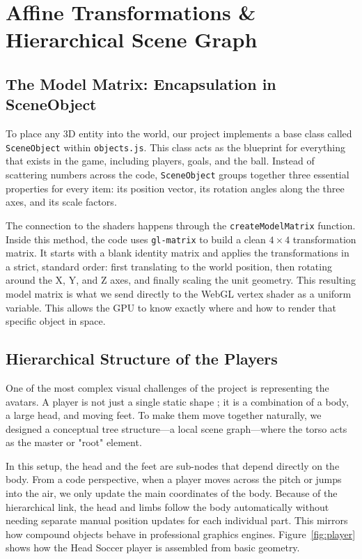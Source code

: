 \chapter{Affine Transformations \& Hierarchical Scene Graph}

\section{The Model Matrix: Encapsulation in SceneObject}
To place any 3D entity into the world, our project implements a base class called \texttt{SceneObject} within \texttt{objects.js}. This class acts as the blueprint for everything that exists in the game, including players, goals, and the ball. Instead of scattering numbers across the code, \texttt{SceneObject} groups together three essential properties for every item: its position vector, its rotation angles along the three axes, and its scale factors.

The connection to the shaders happens through the \texttt{createModelMatrix} function. Inside this method, the code uses \texttt{gl-matrix} to build a clean $4\times4$ transformation matrix. It starts with a blank identity matrix and applies the transformations in a strict, standard order: first translating to the world position, then rotating around the X, Y, and Z axes, and finally scaling the unit geometry. This resulting model matrix is what we send directly to the WebGL vertex shader as a uniform variable. This allows the GPU to know exactly where and how to render that specific object in space.

\section{Hierarchical Structure of the Players}
One of the most complex visual challenges of the project is representing the avatars. A player is not just a single static shape ; it is a combination of a body, a large head, and moving feet. To make them move together naturally, we designed a conceptual tree structure—a local scene graph—where the torso acts as the master or "root" element.

In this setup, the head and the feet are sub-nodes that depend directly on the body. From a code perspective, when a player moves across the pitch or jumps into the air, we only update the main coordinates of the body. Because of the hierarchical link, the head and limbs follow the body automatically without needing separate manual position updates for each individual part. This mirrors how compound objects behave in professional graphics engines. Figure~\ref{fig:player} shows how the Head Soccer player is assembled from basic geometry. 

